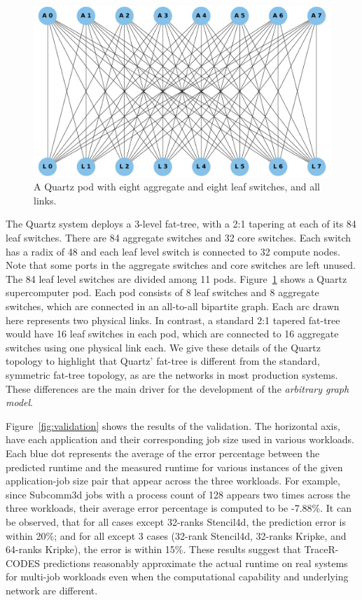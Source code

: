 \begin{figure}[h]
  \centering
  \includegraphics[width=0.8\columnwidth]{figure/val/quartztopo.pdf}
  \caption{A Quartz pod with eight aggregate and eight leaf switches, and all links.}
  \label{fig:quartz_pod}
\end{figure}

\vspace{0.08in}
 The Quartz system deploys a 3-level fat-tree, with a 2:1
tapering at each of its 84 leaf switches. There are 84 aggregate switches and 32
core switches. Each switch has a radix of 48 and each leaf level switch is
connected to 32 compute nodes.  Note that some ports in the aggregate switches
and core switches are left unused.  The 84 leaf level switches are divided among 
11 pods. Figure~\ref{fig:quartz_pod} shows a Quartz supercomputer pod.  Each pod consists 
of 8 leaf switches and 8 aggregate switches, which are connected in an
all-to-all bipartite graph. Each arc drawn here represents two physical links. 
In contrast, a standard 2:1 tapered fat-tree would have 16 leaf switches in 
each pod, which are connected to 16 aggregate switches using one physical link
each. We give these details of the Quartz topology to highlight that
Quartz' fat-tree is different from the standard, symmetric fat-tree topology,
as are the networks in most production systems. These differences are the main driver
for the development of the {\em arbitrary graph model}. 

Figure~\ref{fig:validation} shows the results of the validation. The
horizontal axis, have each application and their corresponding job size used
in various workloads. Each blue dot represents the average 
of the error percentage between the predicted runtime and the measured runtime
for various
instances of the given application-job size pair that appear across the three workloads. For
example, since Subcomm3d jobs with a process count of 128 appears two times
across the three workloads, their average error percentage is computed to be
-7.88\%. It can be observed, that for all cases except 32-ranks
Stencil4d, the prediction error is within 20\%; and for all except 3 cases
(32-rank Stencil4d, 32-ranks Kripke, and 64-ranks Kripke), the error is within 15\%.
These results suggest that TraceR-CODES predictions reasonably approximate 
the actual runtime on real systems for multi-job workloads even when the
computational capability and underlying network are different.

